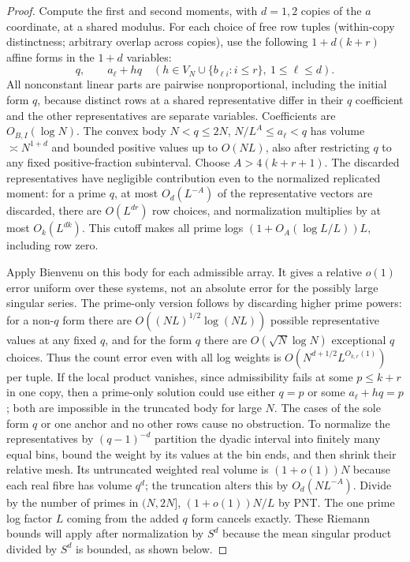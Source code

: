 \documentclass[11pt]{article}
\newcommand{\1}{\mathbf{1}}
\begin{document}
\begin{proof}
Compute the first and second moments, with $d=1,2$ copies of the $a$ coordinate, at a shared modulus. For each choice of free row tuples (within-copy distinctness; arbitrary overlap across copies), use the following $1+d(k+r)$ affine forms in the $1+d$ variables:
\[
 q,\qquad a_\ell+hq\quad (h\in V_N\cup\{b_{\ell i}:i\le r\},\ 1\le\ell\le d).
\]
All nonconstant linear parts are pairwise nonproportional, including the initial form $q$, because distinct rows at a shared representative differ in their $q$ coefficient and the other representatives are separate variables. Coefficients are $O_{B,I}(\log N)$. The convex body $N<q\le2N$, $N/L^A\le a_\ell<q$ has volume $\asymp N^{1+d}$ and bounded positive values up to $O(NL)$, also after restricting $q$ to any fixed positive-fraction subinterval. Choose $A>4(k+r+1)$. The discarded representatives have negligible contribution even to the normalized replicated moment: for a prime $q$, at most $O_d(L^{-A})$ of the representative vectors are discarded, there are $O(L^{dr})$ row choices, and normalization multiplies by at most $O_k(L^{dk})$. This cutoff makes all prime logs $(1+O_A(\log L/L))L$, including row zero.

Apply Bienvenu \cite[Thm.~1.3]{bien} on this body for each admissible array. It gives a relative $o(1)$ error uniform over these systems, not an absolute error for the possibly large singular series. The prime-only version follows by discarding higher prime powers: for a non-$q$ form there are $O((NL)^{1/2}\log(NL))$ possible representative values at any fixed $q$, and for the form $q$ there are $O(\sqrt N\log N)$ exceptional $q$ choices. Thus the count error even with all log weights is $O(N^{d+1/2}L^{O_{k,r}(1)})$ per tuple. If the local product vanishes, since admissibility fails at some $p\le k+r$ in one copy, then a prime-only solution could use either $q=p$ or some $a_\ell+hq=p$; both are impossible in the truncated body for large $N$. The cases of the sole form $q$ or one anchor and no other rows cause no obstruction. To normalize the representatives by $(q-1)^{-d}$ partition the dyadic interval into finitely many equal bins, bound the weight by its values at the bin ends, and then shrink their relative mesh. Its untruncated weighted real volume is $(1+o(1))N$ because each real fibre has volume $q^d$; the truncation alters this by $O_d(NL^{-A})$. Divide by the number of primes in $(N,2N]$, $(1+o(1))N/L$ by PNT. The one prime log factor $L$ coming from the added $q$ form cancels exactly. These Riemann bounds will apply after normalization by $S^d$ because the mean singular product divided by $S^d$ is bounded, as shown below.


\end{proof}
\end{document}
